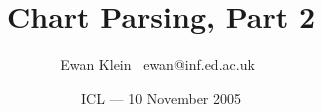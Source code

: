 % 
%
%
%
%
%
%
\title{Chart Parsing, Part 2}
\author{Ewan Klein \newline \mbox{ }ewan@inf.ed.ac.uk\mbox{ }}
\date{ICL --- 10 November 2005}



\newcommand{\Rule}{\rule{\textwidth}{1pt}}
\newcommand{\SqB}[1]{[#1]}

\newcommand{\bigdot}{\mbox{\begin{scriptsize}{\ensuremath{\bullet}}\end{scriptsize}}}

\newcommand{\chdot}{\bigdot}





\usepackage{color}
\usepackage{amsmath}
\usepackage{graphicx}
\usepackage[plain]{algorithm}
% 

\newcommand{\Hilite}[1]{\colorbox{yellow}{#1}}
\newcommand{\Shade}[1]{\colorbox{light}{#1}}

\newcommand{\Em}[1]{\textcolor{red}{#1}}
\newcommand{\Dim}[1]{\textcolor{gray}{#1}}

\setlength{\parskip}{0in}
\setlength{\parindent}{0in}

\def\tab{\hbox{\kern0.4in}}    %
\def\al{\\\tab}                %
\def\nl{\\\tab\tab}            %
\def\nnl{\\\tab\tab\tab}       %
\def\blob{$\diamondsuit\ \ $}  %
\def\mysum{\begin{Huge}\mbox{$\Sigma$}\end{Huge}}
\def\myprod{\begin{Huge}\mbox{$\Pi$}\end{Huge}}
\def\rarrow{$\rightarrow\ \ $}  %

